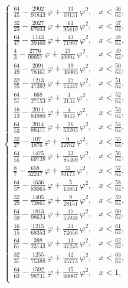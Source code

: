 \begin{equation*}
\begin{cases}
		\frac{64}{45} - \frac{2902}{91843}\,\varphi + \frac{13}{19131}\,\varphi^2, & x < \frac{46}{64},\\
		\frac{32}{23} - \frac{2027}{67033}\,\varphi + \frac{61}{95819}\,\varphi^2, & x < \frac{47}{64},\\
		\frac{64}{47} - \frac{1143}{39460}\,\varphi + \frac{43}{71997}\,\varphi^2, & x < \frac{48}{64},\\
		\frac{4}{3} - \frac{2776}{99957}\,\varphi + \frac{23}{40994}\,\varphi^2, & x < \frac{49}{64},\\
		\frac{64}{49} - \frac{2091}{78461}\,\varphi + \frac{19}{36003}\,\varphi^2, & x < \frac{50}{64},\\
		\frac{32}{25} - \frac{1213}{47392}\,\varphi + \frac{37}{74447}\,\varphi^2, & x < \frac{51}{64},\\
		\frac{64}{51} - \frac{668}{27153}\,\varphi + \frac{1}{2134}\,\varphi^2, & x < \frac{52}{64},\\
		\frac{16}{13} - \frac{2011}{84980}\,\varphi + \frac{4}{9043}\,\varphi^2, & x < \frac{53}{64},\\
		\frac{64}{53} - \frac{2014}{88411}\,\varphi + \frac{26}{62203}\,\varphi^2, & x < \frac{54}{64},\\
		\frac{32}{27} - \frac{107}{4876}\,\varphi + \frac{9}{22762}\,\varphi^2, & x < \frac{55}{64},\\
		\frac{64}{55} - \frac{1475}{69728}\,\varphi + \frac{32}{85469}\,\varphi^2, & x < \frac{56}{64},\\
		\frac{8}{7} - \frac{658}{32247}\,\varphi + \frac{32}{90173}\,\varphi^2, & x < \frac{57}{64},\\
		\frac{64}{57} - \frac{1636}{83065}\,\varphi + \frac{5}{14851}\,\varphi^2, & x < \frac{58}{64},\\
		\frac{32}{29} - \frac{1405}{73861}\,\varphi + \frac{9}{28151}\,\varphi^2, & x < \frac{59}{64},\\
		\frac{64}{59} - \frac{1813}{98624}\,\varphi + \frac{17}{55948}\,\varphi^2, & x < \frac{60}{64},\\
		\frac{16}{15} - \frac{1215}{68353}\,\varphi + \frac{21}{72656}\,\varphi^2, & x < \frac{61}{64},\\
		\frac{64}{61} - \frac{398}{23143}\,\varphi + \frac{13}{47245}\,\varphi^2, & x < \frac{62}{64},\\
		\frac{32}{31} - \frac{1255}{75388}\,\varphi + \frac{12}{45773}\,\varphi^2, & x < \frac{63}{64},\\
		\frac{64}{63} - \frac{1592}{98741}\,\varphi + \frac{15}{60007}\,\varphi^2, & x < 1,\\
	\end{cases}	
\end{equation*}

